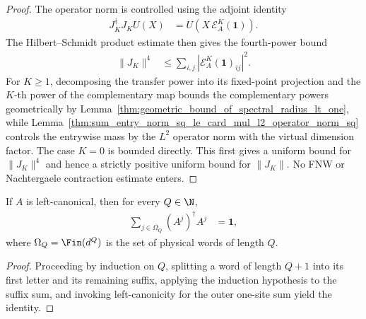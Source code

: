 \begin{proof}
    \leanok
    The operator norm is controlled using the adjoint identity
    \begin{align}
        J_K^\dagger J_K U(X)
         & =U\!\left(X\,\mathcal E_A^K(\mathbf 1)\right).
    \end{align}
    The Hilbert--Schmidt product estimate then gives the fourth-power bound
    \begin{align}
        \lVert J_K\rVert^4
         & \leq \sum_{i,j}\left\lvert
        \mathcal E_A^K(\mathbf 1)_{ij}\right\rvert^2.
    \end{align}
    For $K\geq1$, decomposing the transfer power into its fixed-point projection
    and the $K$-th power of the complementary map bounds the complementary
    powers geometrically by
    Lemma~\ref{thm:geometric_bound_of_spectral_radius_lt_one}, while
    Lemma~\ref{thm:sum_entry_norm_sq_le_card_mul_l2_operator_norm_sq}
    controls the entrywise mass by the $L^2$ operator norm with the virtual
    dimension factor.
    The case $K=0$ is bounded directly.  This first gives a uniform bound for
    $\lVert J_K\rVert^4$ and hence a strictly positive uniform bound for
    $\lVert J_K\rVert$.  No FNW or Nachtergaele contraction estimate enters.
\end{proof}

\begin{lemma}
    \label{thm:word_left_canonical_normalization}
    \leanok
    If $A$ is left-canonical, then for every $Q\in\N$,
    \begin{align}
        \sum_{j\in\Omega_Q}(A^j)^\dagger A^j & =\mathbf 1,
    \end{align}
    where $\Omega_Q=\Fin(d^Q)$ is the set of physical words of length $Q$.
\end{lemma}

\begin{proof}
    \leanok
    Proceeding by induction on $Q$, splitting a word of length $Q+1$ into its
    first letter and its remaining suffix, applying the induction hypothesis
    to the suffix sum, and invoking left-canonicity for the outer one-site sum
    yield the identity.
\end{proof}

